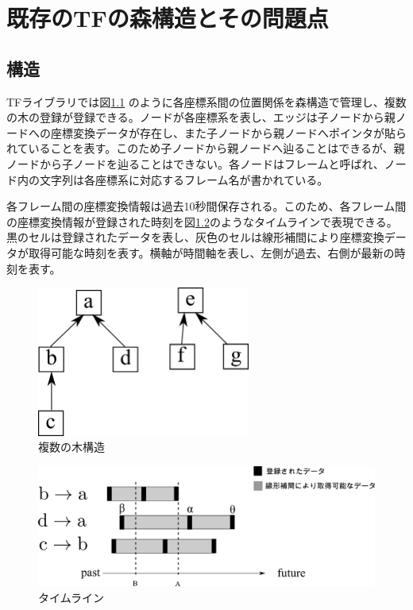 \documentclass[a4paper]{jreport}	%
\begin{document}
\chapter{既存のTFの森構造とその問題点}
\section{構造}
TFライブラリでは図\ref{fig:multitree} のように各座標系間の位置関係を森構造で管理し、複数の木の登録が登録できる。ノードが各座標系を表し、エッジは子ノードから親ノードへの座標変換データが存在し、また子ノードから親ノードへポインタが貼られていることを表す。このため子ノードから親ノードへ辿ることはできるが、親ノードから子ノードを辿ることはできない。各ノードはフレームと呼ばれ、ノード内の文字列は各座標系に対応するフレーム名が書かれている。

各フレーム間の座標変換情報は過去10秒間保存される。このため、各フレーム間の座標変換情報が登録された時刻を図\ref{fig:general-timeline}のようなタイムラインで表現できる。黒のセルは登録されたデータを表し、灰色のセルは線形補間により座標変換データが取得可能な時刻を表す。横軸が時間軸を表し、左側が過去、右側が最新の時刻を表す。

\begin{figure}[h] 
\centering
\includegraphics[width=7cm]{multitree.png}	
\caption{複数の木構造}
\label{fig:multitree}
\end{figure}

\begin{figure}[h] 
\centering
\includegraphics[width=15cm]{general-timeline.png}
\caption{タイムライン}
\label{fig:general-timeline}
\end{figure}
\end{document}
